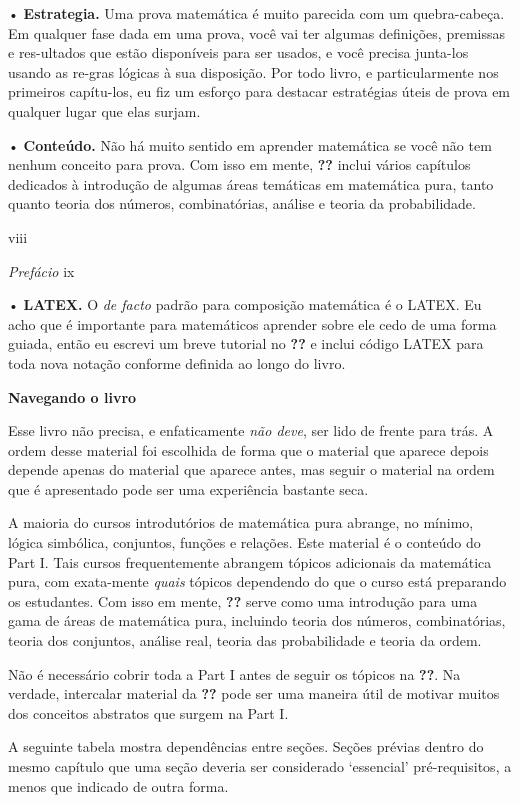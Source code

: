 \documentclass[
]{article}
\begin{document}
• \textbf{Estrategia.} Uma prova matemática é muito parecida com um
quebra-cabeça. Em qualquer fase dada em uma prova, você vai ter algumas
definições, premissas e res-ultados que estão disponíveis para ser
usados, e você precisa junta-los usando as re-gras lógicas à sua
disposição. Por todo livro, e particularmente nos primeiros capítu-los,
eu fiz um esforço para destacar estratégias úteis de prova em qualquer
lugar que elas surjam.

• \textbf{Conteúdo.} Não há muito sentido em aprender matemática se você
não tem nenhum conceito para prova. Com isso em mente, \textbf{??}
inclui vários capítulos dedicados à introdução de algumas áreas
temáticas em matemática pura, tanto quanto teoria dos números,
combinatórias, análise e teoria da probabilidade.

viii

\emph{Prefácio} ix

• \textbf{LATEX.} O \emph{de facto} padrão para composição matemática é
o LATEX. Eu acho que é importante para matemáticos aprender sobre ele
cedo de uma forma guiada, então eu escrevi um breve tutorial no
\textbf{??} e inclui código LATEX para toda nova notação conforme
definida ao longo do livro.

\textbf{Navegando o livro}

Esse livro não precisa, e enfaticamente \emph{não deve}, ser lido de
frente para trás. A ordem desse material foi escolhida de forma que o
material que aparece depois depende apenas do material que aparece
antes, mas seguir o material na ordem que é apresentado pode ser uma
experiência bastante seca.

A maioria do cursos introdutórios de matemática pura abrange, no mínimo,
lógica simbólica, conjuntos, funções e relações. Este material é o
conteúdo do Part I. Tais cursos frequentemente abrangem tópicos
adicionais da matemática pura, com exata-mente \emph{quais} tópicos
dependendo do que o curso está preparando os estudantes. Com isso em
mente, \textbf{??} serve como uma introdução para uma gama de áreas de
matemática pura, incluindo teoria dos números, combinatórias, teoria dos
conjuntos, análise real, teoria das probabilidade e teoria da ordem.

Não é necessário cobrir toda a Part I antes de seguir os tópicos na
\textbf{??}. Na verdade, intercalar material da \textbf{??} pode ser uma
maneira útil de motivar muitos dos conceitos abstratos que surgem na
Part I.

A seguinte tabela mostra dependências entre seções. Seções prévias
dentro do mesmo capítulo que uma seção deveria ser considerado
`essencial' pré-requisitos, a menos que indicado de outra forma.
\end{document}
